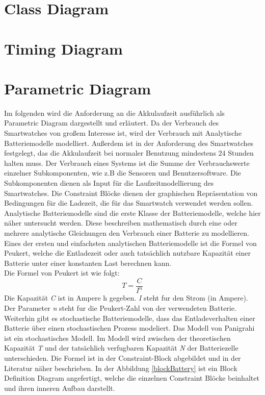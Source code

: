 \section{Class Diagram}



\section{Timing Diagram}

\section{Parametric Diagram}
Im folgenden wird die Anforderung an die Akkulaufzeit ausführlich als Parametric Diagram dargestellt und erläutert.
Da der Verbrauch des Smartwatches von großem Interesse ist, wird der Verbrauch 
mit Analytische Batteriemodelle modelliert.
Außerdem ist in der Anforderung des Smartwatches festgelegt, das die Akkulaufzeit bei normaler Benutzung mindestens 24 Stunden halten muss. %
Der Verbrauch eines Systems ist die Summe der Verbrauchswerte einzelner Subkomponenten, wie z.B die Sensoren und Benutzersoftware. Die Subkomponenten dienen als Input für die Laufzeitmodellierung des Smartwatches.
Die Constraint Blöcke dienen der graphischen Repräsentation von Bedingungen für die Ladezeit, die für das Smartwatch verwendet werden sollen. 
Analytische Batteriemodelle sind die erste Klasse der Batteriemodelle, welche
hier näher untersucht werden.
Diese beschreiben mathematisch durch eine oder mehrere analytische Gleichungen den Verbrauch einer Batterie zu modellieren.
Eines der ersten und einfachsten analytischen Batteriemodelle ist die Formel
von Peukert, welche die Entladezeit oder auch tatsächlich nutzbare Kapazität
einer Batterie unter einer konstanten Last berechnen kann.\\ %
Die Formel von Peukert ist wie folgt:
\[
T= \frac{C}{I^{n}}
\]
Die Kapazität \textit{C} ist in Ampere h gegeben.
\textit{I} steht fur den Strom (in Ampere). Der Parameter \textit{n} steht fur die 
Peukert-Zahl von der verwendeten Batterie.\\
Weiterhin gibt es stochastische Batteriemodelle, dass das Entladeverhalten einer Batterie
über einen stochastischen Prozess modeliert.
Das Modell von Panigrahi ist ein stochastisches Modell.
Im Modell wird zwischen der theoretischen Kapazität \textit{T} und der tatsächlich verfugbaren
Kapazität \textit{N} der Batteriezelle unterschieden.
Die Formel ist in der Constraint-Block abgebildet und in der Literatur näher beschrieben.
In der Abbildung \ref{blockBattery} ist ein Block Definition Diagram angefertigt, welche die einzelnen Constraint Blöcke beinhaltet und ihren inneren Aufbau darstellt.

